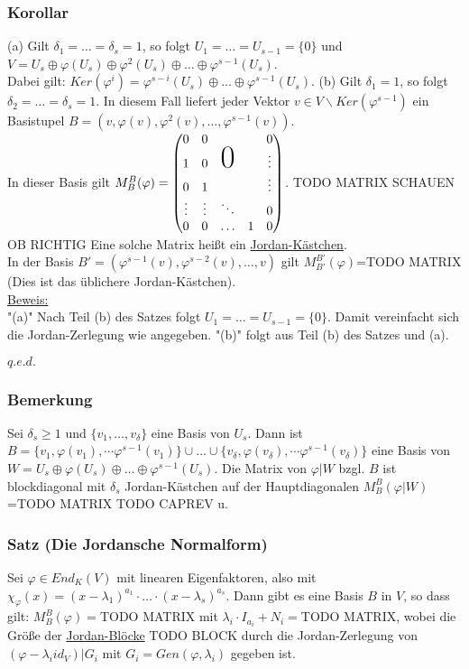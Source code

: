 \documentclass[a4paper]{article}
\newcommand{\ul}{\underline}
\renewcommand{\proof}{\ul{Beweis:}\\}
\renewcommand{\qed}{\begin{flushright}
\ul{\(q.e.d.\)}
\end{flushright}}
\let\phi\varphi
\begin{document}
\subsubsection{Korollar}
(a) Gilt \(\delta_1=\dots=\delta_s=1\), so folgt \(U_1=\dots=U_{s-1}=\{0\}\) und \(V=U_s\oplus \phi(U_s)\oplus\phi^2(U_s)\oplus\dots\oplus\phi^{s-1}(U_s)\).\\
Dabei gilt: \(Ker(\phi^i)=\phi^{s-i}(U_s)\oplus\dots\oplus\phi^{s-1}(U_s)\).
(b) Gilt \(\delta_1=1\), so folgt \(\delta_2=\dots=\delta_s=1\). In diesem Fall liefert jeder Vektor \(v\in V\backslash Ker(\phi^{s-1})\) ein Basistupel \(B=(v,\phi(v),\phi^2(v),\dots,\phi^{s-1}(v))\).\\
In dieser Basis gilt \(M_B^B(\phi)=\begin{pmatrix}
0 & 0 & & & 0\\
1 & 0 & \mbox{\Huge 0} & & \vdots\\
0 & 1 & & & \vdots\\
\vdots & \vdots & \ddots & & 0\\
0 & 0 & \hdots & 1 & 0
\end{pmatrix}\). TODO MATRIX SCHAUEN OB RICHTIG
Eine solche Matrix heißt ein \ul{Jordan-Kästchen}.\\
In der Basis \(B'=(\phi^{s-1}(v),\phi^{s-2}(v),\dots,v)\) gilt \(M_{B'}^{B'}(\phi)\)=TODO MATRIX (Dies ist das üblichere Jordan-Kästchen).\\
\proof
"(a)" Nach Teil (b) des Satzes folgt \(U_1=\dots=U_{s-1}=\{0\}\). Damit vereinfacht sich die Jordan-Zerlegung wie angegeben.
"(b)" folgt aus Teil (b) des Satzes und (a).
\qed
\subsubsection{Bemerkung}
Sei \(\delta_s\geq 1\) und \(\{v_1,\dots,v_\delta\}\) eine Basis von \(U_s\). Dann ist \(B=\{v_1,\phi(v_1),\dotsm\phi^{s-1}(v_1)\}\cup\dots\cup\{v_\delta,\phi(v_\delta),\dotsm\phi^{s-1}(v_\delta)\}\) eine Basis von \(W=U_s\oplus\phi(U_s)\oplus\dots\oplus\phi^{s-1}(U_s)\). Die Matrix von \(\phi|W\) bzgl. \(B\) ist blockdiagonal mit \(\delta_s\) Jordan-Kästchen auf der Hauptdiagonalen \(M_B^B(\phi|W)\)=TODO MATRIX  TODO CAPREV u.\\
\subsubsection{Satz (Die Jordansche Normalform)}
Sei \(\phi\in End_K(V)\) mit linearen Eigenfaktoren, also mit \(\chi_\phi(x)=(x-\lambda_1)^{a_1}\cdot\dots\cdot(x-\lambda_s)^{a_s}\). Dann gibt es eine Basis \(B\) in \(V\), so dass gilt: \(M_B^B(\phi)=\)TODO MATRIX mit \(\lambda_i\cdot I_{a_i}+N_i=\)TODO MATRIX, wobei die Größe der \ul{Jordan-Blöcke} TODO BLOCK durch die Jordan-Zerlegung von \((\phi-\lambda_iid_V)|G_i\) mit \(G_i=Gen(\phi,\lambda_i)\) gegeben ist.
\end{document}
